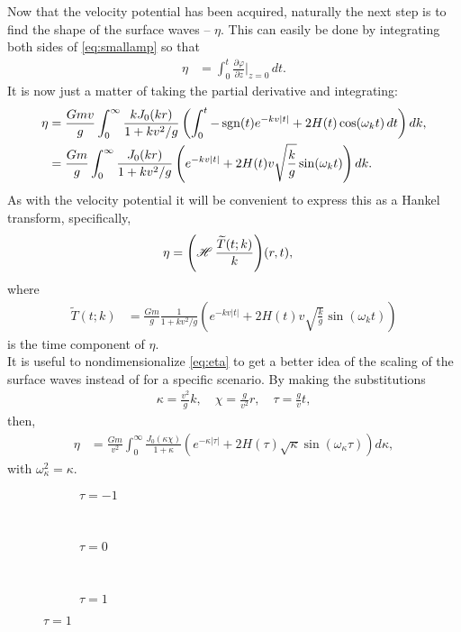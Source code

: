 Now that the velocity potential has been acquired, naturally the next step is to find the shape of the surface waves -- $\eta$. This can easily be done by integrating both sides of \eqref{eq:smallamp} so that 
\begin{align*}
\eta &= \int_0^t \frac{\partial \varphi}{\partial z} \bigg|_{z=0} \, dt.
\end{align*}
It is now just a matter of taking the partial derivative and integrating:
\begin{align}
\eta &= \frac{Gmv}{g} \int_0^\infty \frac{k J_0(kr)}{1+kv^2/g} \left( \int_0^t  -\operatorname{sgn}(t)e^{-kv|t|} + 2H(t)\cos(\omega_k t) \, dt \right) dk, \nonumber \\
&= \frac{Gm}{g} \int_0^\infty \frac{J_0(kr)}{1+kv^2/g} \left( e^{-kv|t|} + 2H(t) v \sqrt{\frac{k}{g}} \sin(\omega_k t) \right) dk.
\label{eq:eta}
\end{align}
As with the velocity potential it will be convenient to express this as a Hankel transform, specifically,
\begin{align*}
\eta &= {\left( \operatorname{\mathscr{H}}_{} \frac{\widetilde{T}(t;k)}{k} \right) }(r,t),
\end{align*}
where
\begin{align*}
\widetilde{T}(t;k) &= \frac{Gm}{g} \frac{1}{1+kv^2/g} \left( e^{-kv|t|} + 2H(t) v \sqrt{\frac{k}{g}} \sin(\omega_k t) \right)
\end{align*}
is the time component of $\eta$. \\

It is useful to nondimensionalize \eqref{eq:eta} to get a better idea of the scaling of the surface waves instead of for a specific scenario. By making the substitutions
\begin{align*}
\kappa = \frac{v^2}{g}k, \quad \chi = \frac{g}{v^2}r, \quad \tau = \frac{g}{v}t,
\end{align*}
then,
\begin{align*}
\eta &= \frac{Gm}{v^2} \int_0^\infty \frac{J_0(\kappa \chi)}{1+\kappa} \left( e^{-\kappa|\tau|} + 2H(\tau) \sqrt{\kappa} \sin(\omega_\kappa \tau) \right) d\kappa,
\end{align*}
with $\omega_\kappa^2 = \kappa$.

\begin{figure}[p]
\begin{centering}
 \begin{subfigure}{\textwidth}
  
  \caption{$\tau = -1$}
 \end{subfigure} \\
 \begin{subfigure}{\textwidth}
  
  \caption{$\tau = 0$}
 \end{subfigure} \\
 \begin{subfigure}{\textwidth}
  
  \caption{$\tau = 1$}
 \end{subfigure}
\end{centering}
\end{figure}

